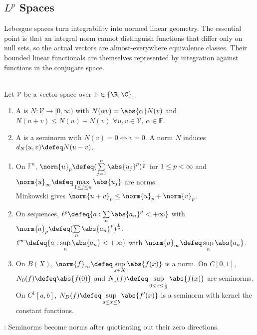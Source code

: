 \subsection{\texorpdfstring{$L^p$}{Lp} Spaces}

%

Lebesgue spaces turn integrability into normed linear geometry. The essential point is that an integral norm cannot distinguish functions that differ only on null sets, so the actual vectors are almost-everywhere equivalence classes. Their bounded linear functionals are themselves represented by integration against functions in the conjugate space.

\begin{definition} \label{def:norms-and-seminorms-lp-source} \\
Let $\mathcal{V}$ be a vector space over $\mathbb{F}\in\{\R,\C\}$.
\begin{enumerate}[label=(\roman*)]
\setlength{\itemsep}{0pt}
\item A  is $N:\mathcal{V}\to[0,\infty)$ with $N(\alpha v)=\abs{\alpha}N(v)$ and $N(u+v)\leq N(u)+N(v)$ $\forall u,v\in\mathcal{V}$, $\alpha\in\mathbb{F}$.
\item A  is a seminorm with $N(v)=0\Longleftrightarrow v=0$. A norm $N$ induces $d_N(u,v)\defeq N(u-v)$.
\end{enumerate}
\end{definition}

\begin{example} \label{ex:coordinate-sequence-function-norms-seminorms} 
\begin{enumerate}[label=(\roman*)]
\setlength{\itemsep}{0pt}
\item On $\mathbb{F}^n$, $\norm{u}_p\defeq(\sum\limits_{j=1}^n\abs{u_j}^p)^{\frac{1}{p}}$ for $1\leq p<\infty$ and $\norm{u}_\infty\defeq\max\limits_{1\leq j\leq n}\abs{u_j}$ are norms.\\
Minkowski gives $\norm{u+v}_p\leq\norm{u}_p+\norm{v}_p$.
\item On sequences, $\ell^p\defeq\{a:\sum\limits_n\abs{a_n}^p<+\infty\}$ with $\norm{a}_p\defeq(\sum\limits_n\abs{a_n}^p)^{\frac{1}{p}}$.\\
$\ell^\infty\defeq\{a:\sup\limits_n\abs{a_n}<+\infty\}$ with $\norm{a}_\infty\defeq\sup\limits_n\abs{a_n}$.
\item On $B(X)$, $\norm{f}_\infty\defeq\sup\limits_{x\in X}\abs{f(x)}$ is a norm. On $C[0,1]$, $N_0(f)\defeq\abs{f(0)}$ and $N_1(f)\defeq\sup\limits_{0\leq x\leq\frac{1}{2}}\abs{f(x)}$ are seminorms. On $C^1[a,b]$, $N_D(f)\defeq\sup\limits_{a\leq x\leq b}\abs{f'(x)}$ is a seminorm with kernel the constant functions.
\end{enumerate}
: Seminorms become norms after quotienting out their zero directions.
\end{example}

